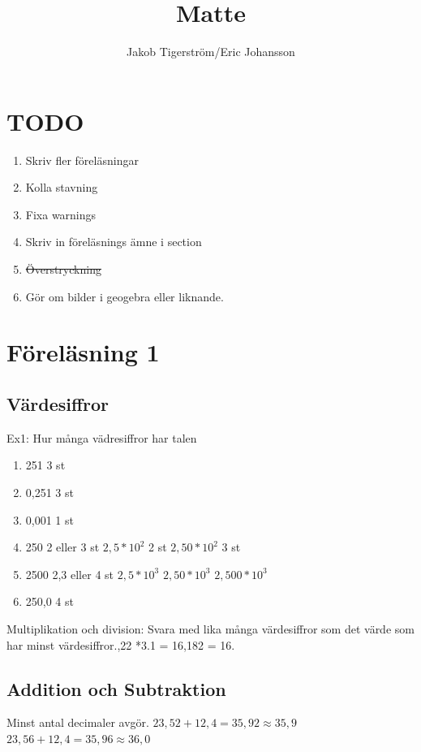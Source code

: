 \documentclass[a4paper,10pt]{article}
\title{Matte}
\author{Jakob Tigerström/Eric Johansson}
\begin{document}
\maketitle
\tableofcontents
\newpage
\begin{flushleft}
\section{TODO}
  \begin{enumerate}
    \item Skriv fler föreläsningar
    \item Kolla stavning
    \item Fixa warnings
    \item Skriv in föreläsnings ämne i section
    \item \sout{Överstryckning}
    \item Gör om bilder i geogebra eller liknande.
  \end{enumerate}
\section{Föreläsning 1}
  \subsection{Värdesiffror}
    Ex1: Hur många vädresiffror har talen
    \begin{enumerate}
      \item 251 3 st
      \item 0,251 3 st
      \item 0,001 1 st
      \item 250 2 eller 3 st\newline
      $ 2,5*10^2 $ 2 st\newline
      $ 2,50*10^2 $ 3 st
        \item 2500 2,3 eller 4 st
      $ 2,5*10^3 $\newline
      $ 2,50*10^3 $\newline
      $ 2,500*10^3 $
      \item 250,0 4 st
    \end{enumerate}
    Multiplikation och division: Svara med lika många värdesiffror som det värde som har minst värdesiffror.,22 *3.1 = 16,182 = 16.
  \subsection{Addition och Subtraktion}
    Minst antal decimaler avgör.\newline
    $ 23,52 + 12,4 = 35,92  \approx 35,9 $\newline
    $ 23,56 + 12,4 = 35,96  \approx 36,0 $

\end{flushleft}
\end{document}

